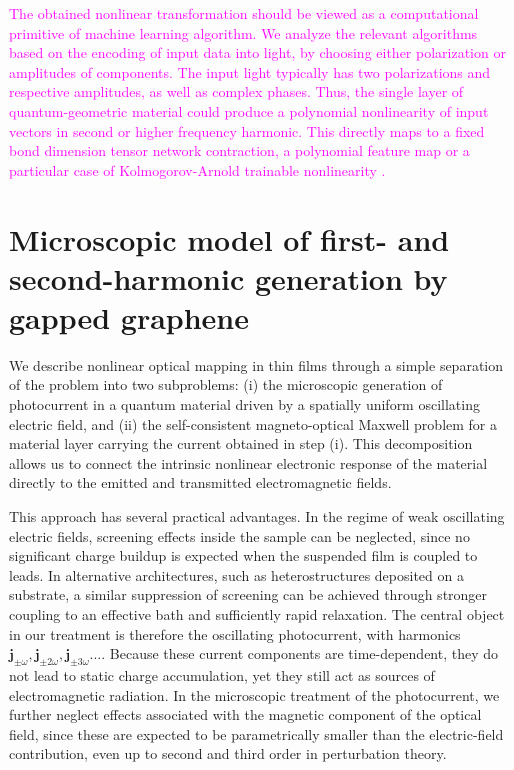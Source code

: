 \documentclass[twocolumn,aps,prb,superscriptaddress,longbibliography]{revtex4-2}
\begin{document}
\textcolor{magenta}{The obtained nonlinear transformation should be viewed as a computational primitive of machine learning algorithm. We analyze the relevant algorithms based on the encoding of input data into light, by choosing either polarization or amplitudes of components. The input light typically has two polarizations and respective amplitudes, as well as complex phases. Thus, the single layer of quantum-geometric material could produce a polynomial nonlinearity of input vectors in second or higher frequency harmonic. This directly maps to a fixed bond dimension tensor network contraction, a polynomial feature map or a particular case of Kolmogorov-Arnold trainable nonlinearity \cite{liu2024kan20kolmogorovarnoldnetworks}. }

\section{Microscopic model of first- and second-harmonic generation by gapped graphene}

We describe nonlinear optical mapping in thin films through a simple separation of the problem into two subproblems: (i) the microscopic generation of photocurrent in a quantum material driven by a spatially uniform oscillating electric field, and (ii) the self-consistent magneto-optical Maxwell problem for a material layer carrying the current obtained in step (i). This decomposition allows us to connect the intrinsic nonlinear electronic response of the material directly to the emitted and transmitted electromagnetic fields.

This approach has several practical advantages. In the regime of weak oscillating electric fields, screening effects inside the sample can be neglected, since no significant charge buildup is expected when the suspended film is coupled to leads. In alternative architectures, such as heterostructures deposited on a substrate, a similar suppression of screening can be achieved through stronger coupling to an effective bath and sufficiently rapid relaxation. The central object in our treatment is therefore the oscillating photocurrent, with harmonics $\mathbf{j}_{\pm\omega},\mathbf{j}_{\pm2\omega},\mathbf{j}_{\pm3\omega}...$. Because these current components are time-dependent, they do not lead to static charge accumulation, yet they still act as sources of electromagnetic radiation. In the microscopic treatment of the photocurrent, we further neglect effects associated with the magnetic component of the optical field, since these are expected to be parametrically smaller than the electric-field contribution, even up to second and third order in perturbation theory.
\end{document}
